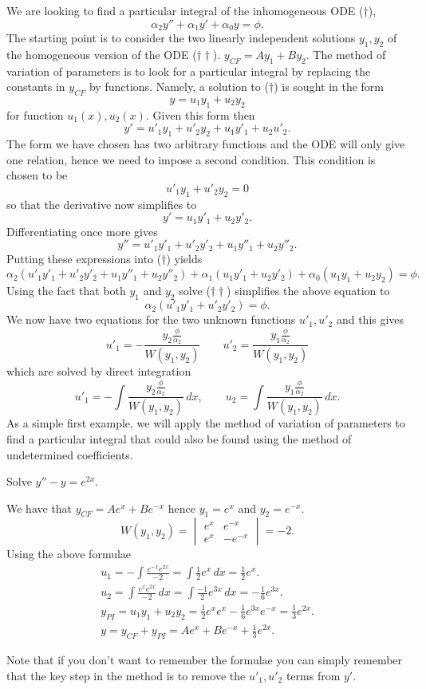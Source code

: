 \documentclass[10pt, a4paper]{article}
\begin{document}
We are looking to find a particular integral of the inhomogeneous ODE ($\dagger$),
\[
\alpha_2y'' + \alpha_1y' + \alpha_0y = \phi.
\]
The starting point is to consider the two linearly independent solutions $y_1, y_2$ of the homogeneous version of the ODE ($\dagger\dagger$).
$y_{CF} = Ay_1 + By_2$.
The method of variation of parameters is to look for a particular integral by replacing the constants in $y_{CF}$ by functions.
Namely,
a solution to ($\dagger$) is sought in the form
\[
y = u_1y_1 + u_2y_2
\]
for function $u_1(x), u_2(x)$.
Given this form then
\[
y' = u'_1y_1 + u'_2y_2 + u_1y'_1 + u_2u'_2.
\]
The form we have chosen has two arbitrary functions and the ODE will only give one relation,
hence we need to impose a second condition.
This condition is chosen to be
\[
u'_1y_1 + u'_2y_2 = 0
\]
so that the derivative now simplifies to
\[
y' = u_1y'_1 + u_2y'_2.
\]
Differentiating once more gives
\[
y'' = u'_1y'_1 + u'_2y'_2 + u_1y''_1 + u_2y''_2.
\]
Putting these expressions into ($\dagger$) yields
\[
\alpha_2(u'_1y'_1 + u'_2y'_2 + u_1y''_1 + u_2y''_2) + \alpha_1(u_1y'_1 + u_2y'_2) + \alpha_0(u_1y_1 + u_2y_2) = \phi.
\]
Using the fact that both $y_1$ and $y_2$ solve ($\dagger\dagger$) simplifies the above equation to
\[
\alpha_2(u'_1y'_1 + u'_2y'_2) = \phi.
\]
We now have two equations for the two unknown functions $u'_1, u'_2$ and this gives
\[
u'_1 = -\frac{y_2\frac{\phi}{\alpha_2}}{W(y_1, y_2)}\qquad u'_2 = \frac{y_1\frac{\phi}{\alpha_2}}{W(y_1, y_2)}
\]
which are solved by direct integration
\[
u'_1 = -\int\frac{y_2\frac{\phi}{\alpha_2}}{W(y_1, y_2)}\,dx,\qquad u_2 = \int\frac{y_1\frac{\phi}{\alpha_2}}{W(y_1, y_2)}\,dx.
\]
As a simple first example,
we will apply the method of variation of parameters to find a particular integral that could also be found using the method of undetermined coefficients.
\begin{example}
    Solve $y'' - y = e ^ {2x}$.

    We have that $y_{CF} = Ae ^ x + Be ^ {-x}$ hence $y_1 = e ^ x$ and $y_2 = e ^ {-x}$.
    \[
    W(y_1, y_2) = \begin{vmatrix}
        e ^ x & e ^ {-x} \\
        e ^ x & -e ^ {-x}
    \end{vmatrix}
    = -2.
    \]
    Using the above formulae
    \begin{gather*}
        u_1 = -\int\frac{e ^ {-x}e ^ {2x}}{-2} = \int\frac{1}{2}e ^ x\,dx = \frac{1}{2}e ^ x. \\
        u_2 = \int\frac{e ^ x e ^ {2x}}{-2}\,dx = \int\frac{-1}{2}e ^ {3x}\,dx = -\frac{1}{6}e ^ {3x}. \\
        y_{PI} = u_1y_1 + u_2y_2 = \frac{1}{2}e ^ {x}e ^ {x} - \frac{1}{6}e ^ {3x}e ^ {-x} = \frac{1}{3}e ^ {2x}. \\
        y = y_{CF} + y_{PI} = Ae ^ x + Be ^ {-x} + \frac{1}{3}e ^ {2x}.
    \end{gather*}
\end{example}
Note that if you don't want to remember the formulae you can simply remember that the key step in the method is to remove the $u'_1, u'_2$ terms from $y'$.
\end{document}
